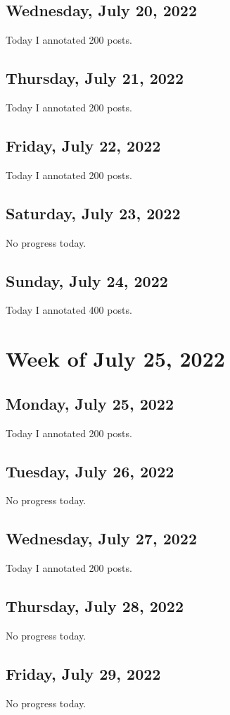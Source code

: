 \documentclass[11pt,letterpaper]{article}
\begin{document}
\subsection{Wednesday, July 20, 2022}
Today I annotated 200 posts.

\subsection{Thursday, July 21, 2022}
Today I annotated 200 posts.

\subsection{Friday, July 22, 2022}
Today I annotated 200 posts.

\subsection{Saturday, July 23, 2022}
No progress today.


\subsection{Sunday, July 24, 2022}
Today I annotated 400 posts.

\section{Week of July 25, 2022}
\subsection{Monday, July 25, 2022}
Today I annotated 200 posts.

\subsection{Tuesday, July 26, 2022}
No progress today.

\subsection{Wednesday, July 27, 2022}
Today I annotated 200 posts.

\subsection{Thursday, July 28, 2022}
No progress today.

\subsection{Friday, July 29, 2022}
No progress today.
\end{document}
